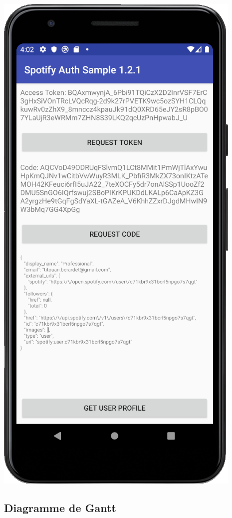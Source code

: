 \documentclass[12pt, openany]{report}
\begin{document}
    \includegraphics[scale=0.5]{images/informations.png}
    
\subsection{Diagramme de Gantt}
\end{document}
